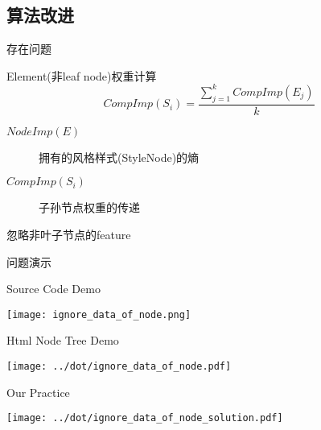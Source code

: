 \documentclass{beamer}
\begin{document}
\subsection{算法改进}
\begin{frame}{存在问题}
    \begin{block}{Element(非leaf node)权重计算}
        {
        $$
        CompImp(S_i) = \frac{
                \sum_{j=1}^{k}{CompImp(E_j)}
            } {k}
        $$}
        \begin{description}
        \item [$NodeImp(E)$] 拥有的风格样式(StyleNode)的熵
        \item [$CompImp(S_i)$] 子孙节点权重的传递
        \end{description}

        \begin{alertblock}{忽略非叶子节点的feature}
        \end{alertblock}
    \end{block}
\end{frame}

\begin{frame}{问题演示}
    \begin{center}
    \begin{overprint}
    \begin{block}{Source Code Demo}
        \begin{center}
        \texttt{[image: ignore\_data\_of\_node.png]}
        \end{center}
    \end{block}
    \begin{block}{Html Node Tree Demo}
        \begin{center}
        \texttt{[image: ../dot/ignore\_data\_of\_node.pdf]}
        \end{center}
    \end{block}
    \begin{block}{Our Practice}
        \begin{center}
        \texttt{[image: ../dot/ignore\_data\_of\_node\_solution.pdf]}
        \end{center}
    \end{block}
    \end{overprint}
    \end{center}
\end{frame}
\end{document}
